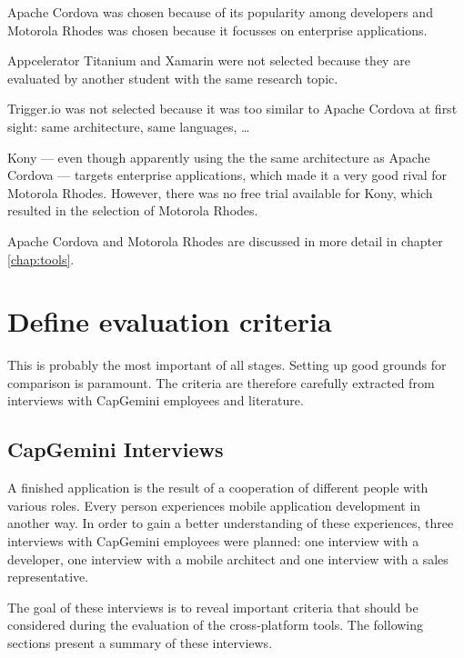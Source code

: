 Apache Cordova was chosen because of its popularity among developers and Motorola Rhodes was chosen because it focusses on enterprise applications. 

Appcelerator Titanium and Xamarin were not selected because they are evaluated by another student with the same research topic. 

Trigger.io was not selected because it was too similar to Apache Cordova at first sight: same architecture, same languages, \ldots


Kony --- even though apparently using the the same architecture as Apache Cordova --- targets enterprise applications, which made it a very good rival for Motorola Rhodes. However, there was no free trial available for Kony, which resulted in the selection of Motorola Rhodes.

Apache Cordova and Motorola Rhodes are discussed in more detail in chapter \ref{chap:tools}.

\section{Define evaluation criteria}

This is probably the most important of all stages. Setting up good grounds for comparison is paramount. The criteria are therefore carefully extracted from interviews with CapGemini employees and literature.

\subsection{CapGemini Interviews}

A finished application is the result of a cooperation of different people with various roles. Every person experiences mobile application development in another way. In order to gain a better understanding of these experiences, three interviews with CapGemini employees were planned: one interview with a developer, one interview with a mobile architect and one interview with a sales representative. 

The goal of these interviews is to reveal important criteria that should be considered during the evaluation of the cross-platform tools. The following sections present a summary of these interviews.

